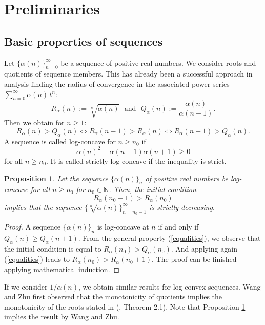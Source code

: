 \documentclass[11pt,reqno]{amsart}
\theoremstyle{plain}
\newtheorem{proposition}[theorem]{Proposition}
\theoremstyle{remark}
\theoremstyle{definition}
\numberwithin{equation}{section}
\begin{document}
\section{Preliminaries}
\subsection{Basic properties of sequences}
Let $\{\alpha(n)\}_{n=0}^{\infty}$ be a sequence of positive real numbers.
We consider roots and quotients of sequence members. This has already been
a successful approach in analysis finding the radius of convergence in the associated power series $\sum_{n=0}^{\infty} \alpha(n)\, t^n$:
\begin{equation*}
R_{\alpha}(n):= \sqrt[n]{\alpha(n)}\,\, \text{ and }\,\, Q_{\alpha}(n):= \frac{\alpha(n)}{\alpha(n-1)}.
\end{equation*}
Then we obtain for $n\geq 1$:
\begin{equation}\label{equalities}
R_{\alpha }\left( n
\right) >Q_{\alpha }\left( n
\right) \Leftrightarrow R_{\alpha }\left( n
-1\right) >R_{\alpha }\left( n
\right) \Leftrightarrow R_{\alpha }\left( n-1\right) >Q_{\alpha }\left( n
\right) .
\end{equation}
A sequence is
called log-concave for $n \geq n_0$ if
\begin{equation*}
\alpha(n)^2 - \alpha(n-1) \alpha(n+1) \geq 0
\end{equation*}
for all $n \geq n_0$. It is
called strictly log-concave if the inequality is strict.
\begin{proposition}\label{prop: strategy}
Let the sequence $\{\alpha(n)\}_n$ of positive real numbers be log-concave 
for all $n \geq n_0$ for $n_0 \in \mathbb{N}$. Then, the initial condition
\begin{equation}\label{special}
R_{\alpha }\left( n_{0} -1\right)
> R_{\alpha }\left( n_{0}\right)
\end{equation}
implies that the sequence $\{\sqrt[n]{\alpha(n)}\}_{n= n_0-1}^{\infty}$ is strictly decreasing.
\end{proposition}
\begin{proof}
A sequence $\{ \alpha(n)\}_n$ is log-concave at $n$ if
and only if
$Q_{\alpha}(n) \geq Q_{\alpha}(n+1)$. From the general property (\ref{equalities}), we observe that the initial condition is equal to $R_{\alpha}(n_0) > Q_{\alpha}(n_0)$. And applying again (\ref{equalities}) leads to $R_{\alpha}(n_0) > R_{\alpha}(n_0+1)$. The proof can be finished
applying mathematical induction. 
\end{proof}
If we consider $ 1 / \alpha(n)$, we obtain similar results for log-convex sequences. Wang and Zhu first observed that the monotonicity
of
quotients implies the monotonicity of the roots stated in (\cite{WZ14}, Theorem 
2.1). Note that Proposition \ref{prop: strategy}
implies the result
by Wang and Zhu.
\end{document}
